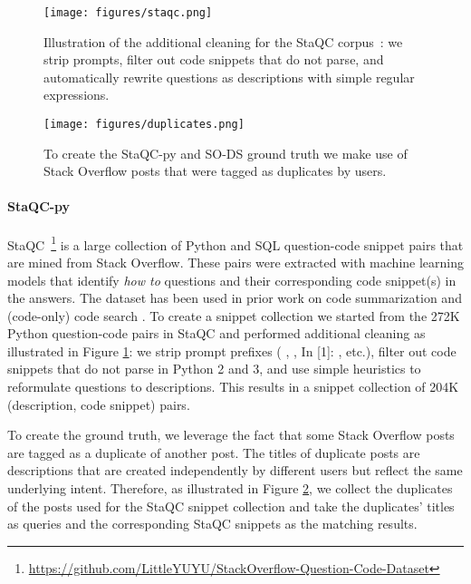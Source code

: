 \documentclass[12pt,conference, onecolumn]{IEEEtran}
\begin{document}
\begin{figure}
\centering
\texttt{[image: figures/staqc.png]}
\caption{Illustration of the additional cleaning for the StaQC corpus~: we strip prompts, filter out code snippets that do not parse, and automatically rewrite questions as descriptions with simple regular expressions.}\label{fig:staqc}
\end{figure}

\begin{figure}
\centering
\texttt{[image: figures/duplicates.png]}
\caption{To create the StaQC-py and SO-DS ground truth we make use of Stack Overflow posts that were tagged as duplicates by users.}\label{fig:duplicates_gt}
\end{figure}

\paragraph{StaQC-py}
StaQC~\cite{yao2018staqc}\footnote{\url{https://github.com/LittleYUYU/StackOverflow-Question-Code-Dataset}} is a large collection of Python and SQL question-code snippet pairs that are mined from Stack Overflow. These pairs were extracted with machine learning models that identify \textit{how to} questions and their corresponding code snippet(s) in the answers. The dataset has been used in prior work on code summarization \cite{peddamail2018comprehensive} and (code-only) code search \cite{yao2019coacor}. To create a snippet collection we started from the 272K Python question-code pairs in StaQC and performed additional cleaning as illustrated in Figure \ref{fig:staqc}: we strip prompt prefixes ( , , In [1]: , etc.), filter out code snippets that do not parse in Python 2 and 3, and use simple heuristics to reformulate questions to descriptions. This results in a snippet collection of 204K (description, code snippet) pairs. 

To create the ground truth, we leverage the fact that some Stack Overflow posts are tagged as a duplicate of another post. The titles of duplicate posts are descriptions that are created independently by different users but reflect the same underlying intent. Therefore, as illustrated in Figure \ref{fig:duplicates_gt}, we collect the duplicates of the posts used for the StaQC snippet collection and take the duplicates' titles as queries and the corresponding StaQC snippets as the matching results.
\end{document}
